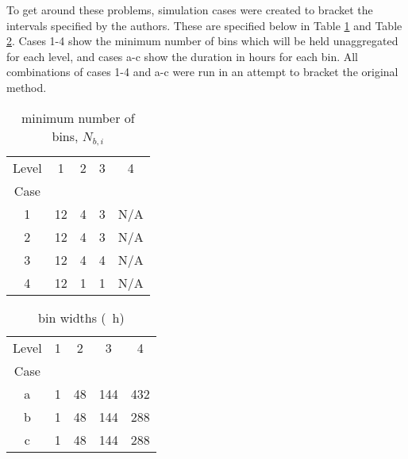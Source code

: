\documentclass[review,12pt]{elsarticle}
\begin{document}
To get around these problems, simulation cases were created to bracket the intervals specified by the authors. These are specified below in Table \ref{tab:MLAA min num bins} and Table \ref{tab:MLAA bin widths}. Cases 1-4 show the minimum number of bins which will be held unaggregated for each level, and cases a-c show the duration in hours for each bin. All combinations of cases 1-4 and a-c were run in an attempt to bracket the original method.

\begin{table}[htbp!]
\centering
\caption{\cite{BernierPinelLabibPaillot2004} minimum number of bins, $N_{b,i}$}
\label{tab:MLAA min num bins}
\begin{tabular}{|ccccc|}
\hline
Level                   & 1                       & 2                      & 3                      & 4   \\
Case                    &                         &                        &                        &     \\ \hline \hline
\multicolumn{1}{|c|}{1} & \multicolumn{1}{c|}{12} & \multicolumn{1}{c|}{4} & \multicolumn{1}{c|}{3} & N/A \\ \hline
\multicolumn{1}{|c|}{2} & \multicolumn{1}{c|}{12} & \multicolumn{1}{c|}{4} & \multicolumn{1}{c|}{3} & N/A \\ \hline
\multicolumn{1}{|c|}{3} & \multicolumn{1}{c|}{12} & \multicolumn{1}{c|}{4} & \multicolumn{1}{c|}{4} & N/A \\ \hline
\multicolumn{1}{|c|}{4} & \multicolumn{1}{c|}{12} & \multicolumn{1}{c|}{1} & \multicolumn{1}{c|}{1} & N/A \\ \hline
\end{tabular}
\end{table}

\begin{table}[htbp!]
\centering
\caption{\cite{BernierPinelLabibPaillot2004} bin widths (\SI{}{\hour})}
\label{tab:MLAA bin widths}
\begin{tabular}{|ccccc|}
\hline
Level                   & 1                      & 2                       & 3                        & 4   \\
Case                    &                        &                         &                          &     \\ \hline \hline
\multicolumn{1}{|c|}{a} & \multicolumn{1}{c|}{1} & \multicolumn{1}{c|}{48} & \multicolumn{1}{c|}{144} & 432 \\ \hline
\multicolumn{1}{|c|}{b} & \multicolumn{1}{c|}{1} & \multicolumn{1}{c|}{48} & \multicolumn{1}{c|}{144} & 288 \\ \hline
\multicolumn{1}{|c|}{c} & \multicolumn{1}{c|}{1} & \multicolumn{1}{c|}{48} & \multicolumn{1}{c|}{144} & 288 \\ \hline
\end{tabular}
\end{table}
\end{document}
